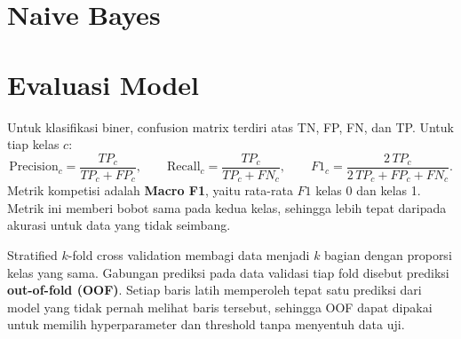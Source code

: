 \section{Naive Bayes}


\section{Evaluasi Model}
Untuk klasifikasi biner, confusion matrix terdiri atas TN, FP, FN, dan TP. Untuk tiap kelas $c$:
\begin{equation}
  \text{Precision}_c = \frac{TP_c}{TP_c+FP_c},\qquad \text{Recall}_c = \frac{TP_c}{TP_c+FN_c},\qquad F1_c = \frac{2\,TP_c}{2\,TP_c+FP_c+FN_c}.
\end{equation}
Metrik kompetisi adalah \textbf{Macro F1}, yaitu rata-rata $F1$ kelas 0 dan kelas 1. Metrik ini memberi bobot sama pada kedua kelas, sehingga lebih tepat daripada akurasi untuk data yang tidak seimbang.

Stratified $k$-fold cross validation membagi data menjadi $k$ bagian dengan proporsi kelas yang sama. Gabungan prediksi pada data validasi tiap fold disebut prediksi \textbf{out-of-fold (OOF)}. Setiap baris latih memperoleh tepat satu prediksi dari model yang tidak pernah melihat baris tersebut, sehingga OOF dapat dipakai untuk memilih hyperparameter dan threshold tanpa menyentuh data uji.
